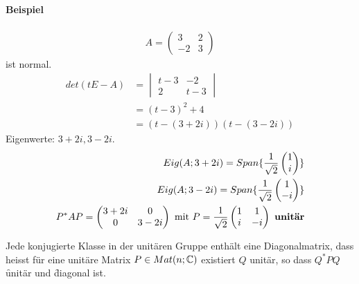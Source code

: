 \paragraph{Beispiel}
\begin{align}
A = \begin{pmatrix} 3 & 2 \\ -2 & 3 \end{pmatrix}
\end{align}
ist normal.
\begin{align}
det(t E - A) &= \begin{vmatrix} t-3 & -2 \\ 2 & t-3 \end{vmatrix} \\
&= (t-3)^2 + 4 \\
&= (t - (3 + 2i)) (t - (3 - 2i))
\end{align}
Eigenwerte: $3 + 2i, 3-2i$.
\begin{align}
Eig(A; 3 + 2i) = Span\{\frac{1}{\sqrt{2}} \begin{pmatrix} 1 \\ i\end{pmatrix}\} \\
Eig(A; 3 - 2i) = Span\{\frac{1}{\sqrt{2}} \begin{pmatrix} 1 \\ -i\end{pmatrix}\} \\
P^{*} A P = \begin{pmatrix} 3 + 2i & 0 \\ 0 & 3-2i \end{pmatrix} \text{ mit } P = \frac{1}{\sqrt{2}}\begin{pmatrix} 1 & 1 \\ i & -i\end{pmatrix} \text{ \textbf{unitär}}
\end{align}

\begin{korollar} %
\label{korollar573}
Jede konjugierte Klasse in der unitären Gruppe enthält eine Diagonalmatrix, dass heisst für eine unitäre Matrix $P \in Mat(n; \mathbb{C})$ existiert $Q$ unitär, so dass $Q^{*} P Q$ \f{unitär} und \f{diagonal} ist.
\end{korollar}
